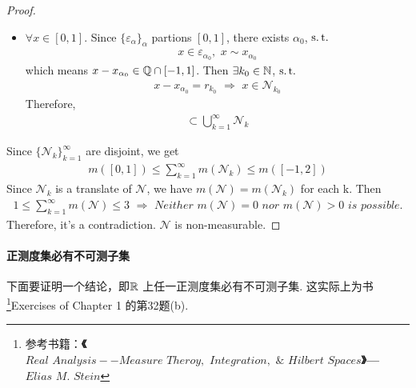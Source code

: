 \begin{thm}
\begin{proof}
\begin{itemize}
				\item $\forall x \in [0 , 1]$. Since $\{ \varepsilon_\alpha \}_{\alpha}$ partions $[0 , 1]$, there exists $\alpha_0$, $\operatorname{s.t.}$
				\begin{align}
					x \in \varepsilon_{\alpha_0} , \,\, x \sim x_{\alpha_0}
				\end{align}
				which means $x - x_{\alpha_0} \in \mathbb{Q} \cap [-1 , 1]$. Then $\exists k_0 \in \mathbb{N}$, $\operatorname{s.t.}$
				\begin{align}
					x - x_{\alpha_0} = r_{k_0} \,\, \Rightarrow \,\, x \in \mathcal{N}_{k_0}
				\end{align}
				Therefore, 
				\begin{align}
					[0 , 1] \subset \bigcup_{k = 1}^{\infty}{\mathcal{N}_k}
				\end{align}
			\end{itemize}
			Since $\{ \mathcal{N}_k \}_{k = 1}^{\infty}$ are disjoint, we get
			\begin{align}
				m([0 , 1]) \leq \sum_{k = 1}^{\infty}{m(\mathcal{N}_k)} \leq m([-1 , 2])
			\end{align}
			Since $\mathcal{N}_k$ is a translate of $\mathcal{N}$, we have $m(\mathcal{N}) = m(\mathcal{N}_k)$ for each k. Then
			\begin{align}
				1 \leq \sum_{k = 1}^{\infty}{m(\mathcal{N})} \leq 3 \,\, \Rightarrow \,\, Neither \,\, m(\mathcal{N}) = 0 \,\, nor \,\, m(\mathcal{N}) > 0 \,\, is \,\, possible.
			\end{align}
			Therefore, it's a contradiction. $\mathcal{N}$ is non-measurable.
		\end{proof}
	\end{thm}

\vspace{2em}
\paragraph{正测度集必有不可测子集}
	下面要证明一个结论，即$\mathbb{R}$ 上任一正测度集必有不可测子集. 这实际上为书\footnote{参考书籍：\textbf{《$Real \,\, Analysis -- Measure \,\, Theroy, \,\, Integration, \,\, \& \,\, Hilbert \,\, Spaces$》--- $Elias \,\, M. \,\, Stein$}}Exercises of Chapter 1 的第32题(b).
	
